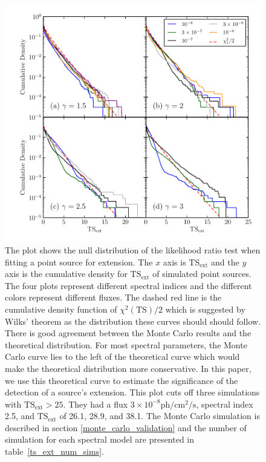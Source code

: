 \documentclass[12pt,preprint]{aastex}
\newcommand{\ph}{\text{ph}\xspace}
\newcommand{\cm}{\text{cm}\xspace}
\renewcommand{\sec}{\text{s}\xspace}
\newcommand{\tsext}{{\ensuremath{\text{TS}_{\text{ext}}}}\xspace}
\newcommand{\ts}{\text{TS}\xspace}
\begin{document}
\clearpage

\clearpage
\begin{figure}
  \begin{center}
    \includegraphics{mc_plots/ts_ext_emin_1000.pdf}
    \end{center}
    \caption{
     The plot shows the null distribution of
    the likelihood ratio test when fitting a point source for extension.
    The $x$ axis is \tsext and the $y$ axis is the cumulative density
    for \tsext of simulated point sources. The four plots represent
    different spectral indices and the different colors represent
    different fluxes.  The dashed red line is the cumulative density
    function of $\chi^2(\ts)/2$ which is suggested by Wilks' theorem
    as the distribution these curves should should follow.  There is
    good agreement between the Monte Carlo results and
    the theoretical distribution. For most spectral parameters, the
    Monte Carlo curve lies to the left of the theoretical curve which
    would make the theoretical distribution more conservative.  In this
    paper, we use this theoretical curve to estimate the significance of
    the detection of a source's extension. This plot cuts off 
    three simulations with $\tsext>25$. They 
    had a flux $3\times10^{-8}\ph/\cm^2/\sec$, spectral index
    2.5, and \tsext of 26.1, 28.9, and 38.1.
    The Monte Carlo simulation is described in 
    section \ref{monte_carlo_validation} and 
    the number of simulation for each spectral model 
    are presented in table~\ref{ts_ext_num_sims}.
    }\label{ts_ext_mc}
  \end{figure}
\end{document}
